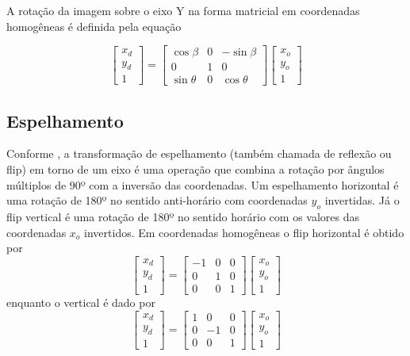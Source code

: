 \documentclass[12pt,oneside,a4paper,english,french,spanish,brazil,]{abntex2}
\begin{document}
A rotação da imagem sobre o eixo Y na forma matricial em coordenadas homogêneas é definida pela equação

\[
\begin{bmatrix}
x_d\\ 
y_d\\ 
1
\end{bmatrix}
=
\begin{bmatrix}
\cos{\beta} & 0 & -\sin{\beta}\\ 
0 & 1 & 0 \\
\sin{\theta} & 0 & \cos{\theta} 
\end{bmatrix}
\begin{bmatrix}
x_o\\ 
y_o\\ 
1
\end{bmatrix}
\]


\subsection{Espelhamento}

Conforme \citet{conci:2003}, a transformação de espelhamento (também chamada de reflexão ou flip) em torno de um eixo é uma operação que combina a rotação por ângulos múltiplos de 90º com a inversão das coordenadas. Um espelhamento horizontal é uma rotação de 180º no sentido anti-horário com coordenadas \(y_o\) invertidas. Já o flip vertical é uma rotação de 180º no sentido horário com os valores das coordenadas \(x_o\) invertidos.
	Em coordenadas homogêneas o flip horizontal é obtido por
\[
\begin{bmatrix}
x_d\\ 
y_d\\ 
1
\end{bmatrix}
=
\begin{bmatrix}
-1 & 0 & 0\\ 
0 & 1 & 0\\ 
0 & 0 & 1
\end{bmatrix}
\begin{bmatrix}
x_o\\ 
y_o\\ 
1
\end{bmatrix}
\]
enquanto o vertical é dado por
\[
\begin{bmatrix}
x_d\\ 
y_d\\ 
1
\end{bmatrix}
=
\begin{bmatrix}
1 & 0 & 0\\ 
0 & -1 & 0\\ 
0 & 0 & 1
\end{bmatrix}
\begin{bmatrix}
x_o\\ 
y_o\\ 
1
\end{bmatrix}
\]
\end{document}
